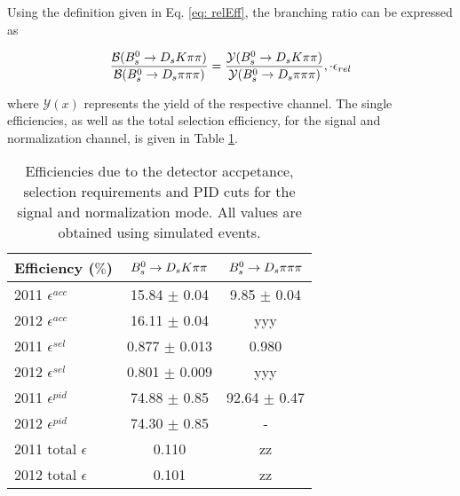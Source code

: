  Using the definition given in Eq. \ref{eq: relEff}, the branching ratio can be expressed as

\begin{equation}
\frac{\mathcal{B}({{B}^0_{s}}\rightarrow{\ensuremath{{D}_{s}}}{\ensuremath{K}}{\ensuremath{\pi}}{\ensuremath{\pi}})}{\mathcal{B}({{B}^0_{s}}\rightarrow{\ensuremath{{D}_{s}}}{\ensuremath{\pi}}{\ensuremath{\pi}}{\ensuremath{\pi}})} = \frac{\mathcal{Y}({{B}^0_{s}}\rightarrow{\ensuremath{{D}_{s}}}{\ensuremath{K}}{\ensuremath{\pi}}{\ensuremath{\pi}})}{\mathcal{Y}({{B}^0_{s}}\rightarrow{\ensuremath{{D}_{s}}}{\ensuremath{\pi}}{\ensuremath{\pi}}{\ensuremath{\pi}})},
\cdot \epsilon_{rel}
\label{eq: BRwEff}
\end{equation} 

where $\mathcal{Y}(x)$ represents the yield of the respective channel. \newline
The single efficiencies, as well as the total selection efficiency, for the signal and normalization channel, is given in Table \ref{tab: effTab}.

\begin{table}[h!]
\centering
\begin{tabular}{l c c}
Efficiency ($\%$) & ${{B}^0_{s}}\rightarrow{\ensuremath{{D}_{s}}}{\ensuremath{K}}{\ensuremath{\pi}}{\ensuremath{\pi}}$ & ${{B}^0_{s}}\rightarrow{\ensuremath{{D}_{s}}}{\ensuremath{\pi}}{\ensuremath{\pi}}{\ensuremath{\pi}}$\\
\hline
2011 $\epsilon^{acc}$ & 15.84 $\pm$ 0.04 & 9.85 $\pm$ 0.04\\
2012 $\epsilon^{acc}$ & 16.11 $\pm$ 0.04 & yyy\\
2011 $\epsilon^{sel}$ & 0.877 $\pm$ 0.013& 0.980\\
2012 $\epsilon^{sel}$ & 0.801 $\pm$ 0.009& yyy\\
2011 $\epsilon^{pid}$ & 74.88 $\pm$ 0.85 & 92.64 $\pm$ 0.47\\
2012 $\epsilon^{pid}$ & 74.30 $\pm$ 0.85 & -\\
\hline
2011 total $\epsilon$ & 0.110 & zz\\
2012 total $\epsilon$ & 0.101 & zz\\
\hline
\end{tabular}
\caption{Efficiencies due to the detector accpetance, selection requirements and PID cuts for the signal and normalization mode. All values are obtained using simulated events.}
\label{tab: effTab}
\end{table}





